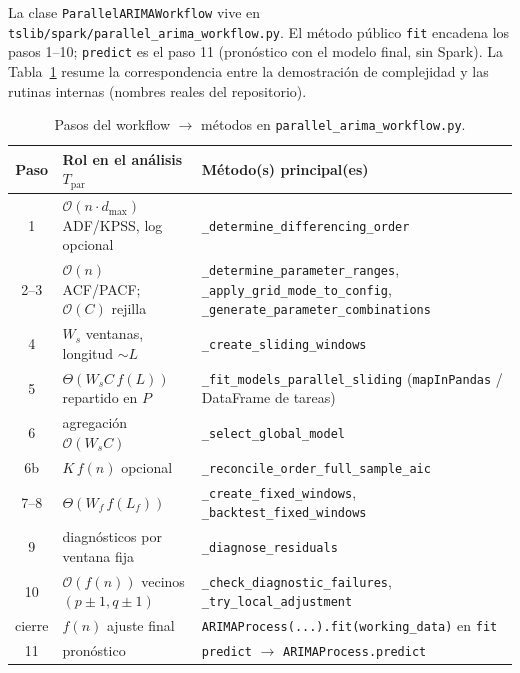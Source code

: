 \documentclass[11pt,a4paper]{article}
\begin{document}
La clase \texttt{ParallelARIMAWorkflow} vive en
\texttt{tslib/spark/parallel\_arima\_workflow.py}. El método público \texttt{fit}
encadena los pasos 1--10; \texttt{predict} es el paso 11 (pronóstico con el modelo
final, sin Spark). La Tabla~\ref{tab:code-map} resume la correspondencia entre la
demostración de complejidad y las rutinas internas (nombres reales del repositorio).

\begin{table}[htbp]
  \centering
  \caption{Pasos del workflow $\rightarrow$ métodos en \texttt{parallel\_arima\_workflow.py}.}
  \label{tab:code-map}
  \begin{tabular}{@{}cp{8.2cm}p{3.8cm}@{}}
    \toprule
    Paso & Rol en el análisis $T_{\mathrm{par}}$ & Método(s) principal(es) \\
    \midrule
    1 & $\mathcal{O}(n\cdot d_{\max})$ ADF/KPSS, log opcional & \texttt{\_determine\_differencing\_order} \\
    2--3 & $\mathcal{O}(n)$ ACF/PACF; $\mathcal{O}(C)$ rejilla & \texttt{\_determine\_parameter\_ranges},
          \texttt{\_apply\_grid\_mode\_to\_config}, \texttt{\_generate\_parameter\_combinations} \\
    4 & $W_s$ ventanas, longitud $\sim L$ & \texttt{\_create\_sliding\_windows} \\
    5 & $\Theta(W_s C\, f(L))$ repartido en $P$ & \texttt{\_fit\_models\_parallel\_sliding}
          (\texttt{mapInPandas} / DataFrame de tareas) \\
    6 & agregación $\mathcal{O}(W_s C)$ & \texttt{\_select\_global\_model} \\
    6b & $K\, f(n)$ opcional & \texttt{\_reconcile\_order\_full\_sample\_aic} \\
    7--8 & $\Theta(W_f\, f(L_f))$ & \texttt{\_create\_fixed\_windows},
          \texttt{\_backtest\_fixed\_windows} \\
    9 & diagnósticos por ventana fija & \texttt{\_diagnose\_residuals} \\
    10 & $\mathcal{O}(f(n))$ vecinos $(p\pm1,q\pm1)$ & \texttt{\_check\_diagnostic\_failures},
          \texttt{\_try\_local\_adjustment} \\
    cierre & $f(n)$ ajuste final & \texttt{ARIMAProcess(...).fit(working\_data)} en \texttt{fit} \\
    11 & pronóstico & \texttt{predict} $\rightarrow$ \texttt{ARIMAProcess.predict} \\
    \bottomrule
  \end{tabular}
\end{table}
\end{document}

